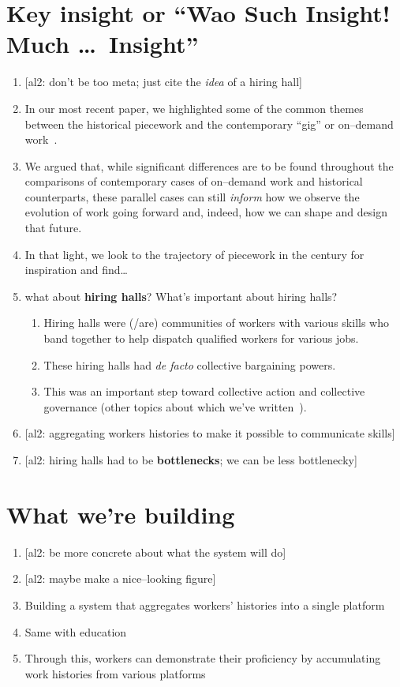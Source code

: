 \documentclass[10pt]{article}
\newcommand{\ali}[1]{{\color{Red}[al2: #1]}}
\newcommand{\joke}[1]{{\color{JokeGreen}#1}} %
\begin{document}
\section*{Key insight \joke{or ``Wao Such Insight! Much \dots~Insight''}}
\begin{enumerate}[noitemsep]
\item \ali{don't be too meta; just cite the \textit{idea} of a hiring hall}
  \item In our most recent paper, we highlighted some of the common themes between
        the historical piecework and the contemporary ``gig'' or
        on--demand work~\cite{pieceworkCrowdworkGigwork}.
  \item We argued that, while significant differences are to be found throughout the comparisons of
        contemporary cases of on--demand work and historical counterparts,
        these parallel cases can still \textit{inform} how we observe the evolution of work going forward
        and, indeed, how we can shape and design that future.
  \item In that light, we look to the trajectory of piecework in the  century for inspiration and find\dots
  \item what about \textbf{hiring halls}? What's important about hiring halls?
  \begin{enumerate}[noitemsep]
    \item Hiring halls were (/are) communities of workers with various skills who band together
          to help dispatch qualified workers for various jobs.
    \item These hiring halls had \textit{de facto} collective bargaining powers.
    \item This was an important step toward collective action and collective governance
          (other topics about which we've written~\cite{dynamo}).
  \end{enumerate}
  \item \ali{aggregating workers histories to make it possible to communicate skills}
  \item \ali{hiring halls had to be \textbf{bottlenecks}; we can be less bottlenecky}
\end{enumerate}

\section*{What we're building}
\begin{enumerate}[noitemsep]
\item \ali{be more concrete about what the system will do}
\item \ali{maybe make a nice--looking figure}
  \item Building a system that aggregates workers' histories into a single platform
  \item Same with education
  \item Through this, workers can demonstrate their proficiency by accumulating work histories from various platforms
\end{enumerate}
\end{document}
